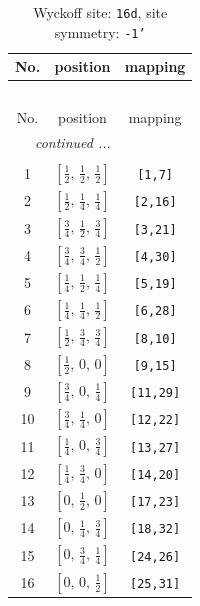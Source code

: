 \documentclass[fleqn,8pt]{jsarticle}
\begin{document}
\renewcommand{\arraystretch}{1.2}
\begin{longtable}{ccc}
\caption{Wyckoff site: {\tt 16d}, site symmetry: {\tt -1'}}
 \\
 \hline \hline
No. & position & mapping \\ \hline \endfirsthead

\multicolumn{2}{l}{\tablename\ \thetable{}} \\
 \hline \hline
No. & position & mapping \\ \hline \endhead

 \hline \hline
\multicolumn{2}{r}{\footnotesize\it continued ...} \\ \endfoot

 \hline \hline
\multicolumn{2}{r}{} \\ \endlastfoot

1 & $\left[ \frac{1}{2},\, \frac{1}{2},\, \frac{1}{2} \right]$ & {\tt [1,7]} \\ \hline
2 & $\left[ \frac{1}{2},\, \frac{1}{4},\, \frac{1}{4} \right]$ & {\tt [2,16]} \\ \hline
3 & $\left[ \frac{3}{4},\, \frac{1}{2},\, \frac{3}{4} \right]$ & {\tt [3,21]} \\ \hline
4 & $\left[ \frac{3}{4},\, \frac{3}{4},\, \frac{1}{2} \right]$ & {\tt [4,30]} \\ \hline
5 & $\left[ \frac{1}{4},\, \frac{1}{2},\, \frac{1}{4} \right]$ & {\tt [5,19]} \\ \hline
6 & $\left[ \frac{1}{4},\, \frac{1}{4},\, \frac{1}{2} \right]$ & {\tt [6,28]} \\ \hline
7 & $\left[ \frac{1}{2},\, \frac{3}{4},\, \frac{3}{4} \right]$ & {\tt [8,10]} \\ \hline
8 & $\left[ \frac{1}{2},\, 0,\, 0 \right]$ & {\tt [9,15]} \\ \hline
9 & $\left[ \frac{3}{4},\, 0,\, \frac{1}{4} \right]$ & {\tt [11,29]} \\ \hline
10 & $\left[ \frac{3}{4},\, \frac{1}{4},\, 0 \right]$ & {\tt [12,22]} \\ \hline
11 & $\left[ \frac{1}{4},\, 0,\, \frac{3}{4} \right]$ & {\tt [13,27]} \\ \hline
12 & $\left[ \frac{1}{4},\, \frac{3}{4},\, 0 \right]$ & {\tt [14,20]} \\ \hline
13 & $\left[ 0,\, \frac{1}{2},\, 0 \right]$ & {\tt [17,23]} \\ \hline
14 & $\left[ 0,\, \frac{1}{4},\, \frac{3}{4} \right]$ & {\tt [18,32]} \\ \hline
15 & $\left[ 0,\, \frac{3}{4},\, \frac{1}{4} \right]$ & {\tt [24,26]} \\ \hline
16 & $\left[ 0,\, 0,\, \frac{1}{2} \right]$ & {\tt [25,31]} \\
\end{longtable}
\end{document}

